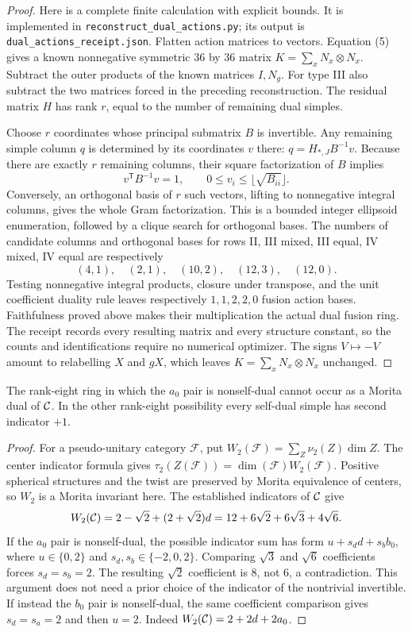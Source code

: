 \begin{proof}
Here is a complete finite calculation with explicit bounds. It is
implemented in \texttt{reconstruct\_dual\_actions.py}; its output is
\texttt{dual\_actions\_receipt.json}. Flatten action matrices to vectors.
Equation (5) gives a known nonnegative symmetric $36$ by $36$ matrix
$K=\sum_x N_x\otimes N_x$. Subtract the outer products of the known
matrices $I,N_g$. For type III also subtract the two matrices forced in
the preceding reconstruction. The residual matrix $H$ has rank $r$,
equal to the number of remaining dual simples.

Choose $r$ coordinates whose principal submatrix $B$ is invertible.
Any remaining simple column $q$ is determined by its coordinates $v$
there: $q=H_{*,J}B^{-1}v$. Because there are exactly $r$ remaining
columns, their square factorization of $B$ implies
\[
v^{\mathsf T}B^{-1}v=1,
\qquad 0\leq v_i\leq\lfloor\sqrt{B_{ii}}\rfloor.
\]
Conversely, an orthogonal basis of $r$ such vectors, lifting to
nonnegative integral columns, gives the whole Gram factorization.
This is a bounded integer ellipsoid enumeration, followed by a clique
search for orthogonal bases. The numbers of candidate columns and
orthogonal bases for rows II, III mixed, III equal, IV mixed, IV equal
are respectively
\[
(4,1),\quad(2,1),\quad(10,2),\quad(12,3),\quad(12,0).
\]
Testing nonnegative integral products, closure under transpose, and the
unit coefficient duality rule leaves respectively $1,1,2,2,0$ fusion
action bases. Faithfulness proved above makes their multiplication the
actual dual fusion ring. The receipt records every resulting matrix
and every structure constant, so the counts and identifications require
no numerical optimizer. The signs $V\mapsto -V$ amount to relabelling
$X$ and $gX$, which leaves $K=\sum_xN_x\otimes N_x$ unchanged.
\end{proof}

\begin{corollary}
The rank-eight ring in which the $a_0$ pair is nonself-dual cannot occur
as a Morita dual of $\mathcal C$. In the other rank-eight possibility every
self-dual simple has second indicator $+1$.
\end{corollary}
\begin{proof}
For a pseudo-unitary category $\mathcal F$, put
$W_2(\mathcal F)=\sum_Z\nu_2(Z)\dim Z$.
The center indicator formula gives
$\tau_2(Z(\mathcal F))=\dim(\mathcal F)W_2(\mathcal F)$.
Positive spherical structures and the twist are preserved by Morita
equivalence of centers, so $W_2$ is a Morita invariant here. The
established indicators of $\mathcal C$ give
\[
W_2(\mathcal C)=2-\sqrt2+(2+\sqrt2)d
       =12+6\sqrt2+6\sqrt3+4\sqrt6.
\]
If the $a_0$ pair is nonself-dual, the possible indicator sum has form
$u+s_d d+s_b b_0$, where $u\in\{0,2\}$ and
$s_d,s_b\in\{-2,0,2\}$. Comparing $\sqrt3$ and $\sqrt6$
coefficients forces $s_d=s_b=2$. The resulting $\sqrt2$ coefficient
is $8$, not $6$, a contradiction. This argument does not need a prior
choice of the indicator of the nontrivial invertible.
If instead the $b_0$ pair is nonself-dual, the same coefficient
comparison gives $s_d=s_a=2$ and then $u=2$.
Indeed $W_2(\mathcal C)=2+2d+2a_0$.
\end{proof}

